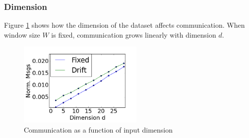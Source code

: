 \documentclass[11pt,twocolumn,varwidth=true,a4paper,fleqn]{article}
\begin{document}
\subsubsection{Dimension}
Figure \ref{Dimension} shows how the dimension of the dataset affects
communication.
When window size $W$ is fixed, communication grows linearly with dimension $d$.
	\begin{figure}[h]
	\centering
	\includegraphics[width=60mm]{CommunicationOfFixedVsDrift/Dimension.png}
	\caption{Communication as a function of input dimension}
	\label{Dimension}
	\end{figure}
\end{document}
